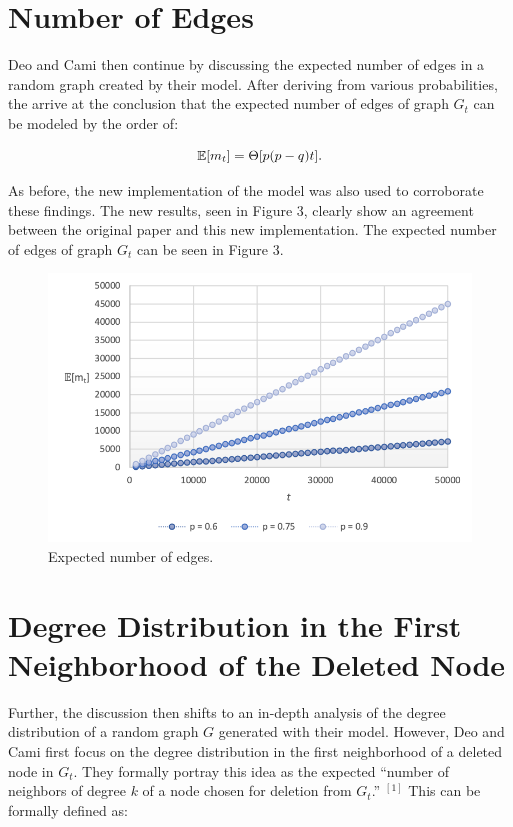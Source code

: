 \documentclass[final,3p,times,twocolumn]{elsarticle}
\begin{document}
\section{Number of Edges}
\label{S:5}

Deo and Cami then continue by discussing the expected number of edges in a random graph created by their model. After deriving from various probabilities, the arrive at the conclusion that the expected number of edges of graph $G_t$ can be modeled by the order of:

\begin{equation}
\centering
    \mathbb{E}[m_t] = \Theta[p(p - q)t].
\end{equation}

As before, the new implementation of the model was also used to corroborate these findings. The new results, seen in Figure 3, clearly show an agreement between the original paper and this new implementation. The expected number of edges of graph $G_t$ can be seen in Figure 3.

\begin{figure}[h]
\centering\includegraphics[width=1\linewidth]{edges.png}
\caption{Expected number of edges.}
\end{figure}

\section{Degree Distribution in the First Neighborhood of the Deleted Node}
\label{S:6}

Further, the discussion then shifts to an in-depth analysis of the degree distribution of a random graph $G$ generated with their model. However, Deo and Cami first focus on the degree distribution in the first neighborhood of a deleted node in $G_t$. They formally portray this idea as the expected “number of neighbors of degree $k$ of a node chosen for deletion from $G_t$.” $^{[1]}$ This can be formally defined as:
\end{document}
